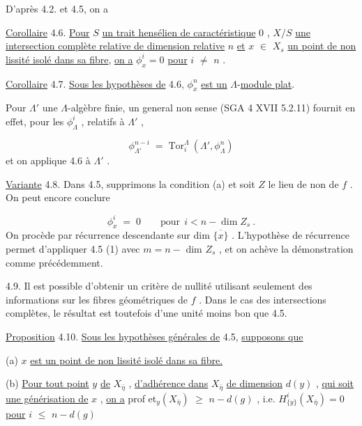 D'après 4.2. et 4.5, on a

\underline{Corollaire} 4.6.  \underline{Pour}  $S$  \underline{un trait hensélien de caractéristique} 0 ,  $X/S$  \underline{une intersection complète relative de dimension relative}  $n$  \underline{et}  $x$ $\in$ $X_s$  \underline{un point de non lissité isolé dans sa fibre}, \underline{on a}  $\phi^i_x = 0$  \underline{pour}  $i$ $\neq$ $n$ .

\underline{Corollaire} 4.7.  \underline{Sous les hypothèses de} 4.6,  $\phi^n_x$  \underline{est un}  $\Lambda$-\underline{module plat}.

Pour  $\Lambda'$  une $\Lambda$-algèbre finie, un general non sense (SGA 4 XVII 5.2.11) fournit en effet, pour les  $\phi^i_{\Lambda}$ , relatifs à  $\Lambda'$ ,



\begin{equation*}
\phi^{n-i}_{\Lambda'} \;=\; \mathrm{Tor}^{\Lambda}_{i}\ (\Lambda',\phi^n_{\Lambda})
\end{equation*}
et on applique 4.6 à  $\Lambda'$  .

\underline{Variante} 4.8.  Dans 4.5, supprimons la condition (a) et soit  $Z$  le lieu de non de  $f$ . On peut encore conclure

\begin{equation*}
\phi^i_x \;=\; 0 \qquad \text{pour}\ \ i < n - \dim Z_s\ .
\end{equation*}
On procède par récurrence descendante sur  dim $\overline{\{x\}}$ . L'hypothèse de récurrence permet d'appliquer 4.5 (1) avec  $m = n -$ dim $Z_s$ , et on achève la démonstration comme précédemment.

4.9.  Il est possible d'obtenir un critère de nullité utilisant seulement des informations sur les fibres géométriques de  $f$ . Dans le cas des intersections complètes, le résultat est toutefois d'une unité moins bon que 4.5.

\underline{Proposition} 4.10.  \underline{Sous les hypothèses générales de} 4.5, \underline{supposons que}

(a)  $x$  \underline{est un point de non lissité isolé dans sa fibre.}

(b) \underline{Pour tout point}  $y$  \underline{de}  $X_{\bar{\eta}}$  , \underline{d'adhérence dans}  $X_{\bar{\eta}}$  \underline{de dimension} $d(y)$ , \underline{qui soit une générisation de}  $x$ , \underline{on a}  prof et$_y(X_{\bar{\eta}})$ $\geqslant$ $n - d(g)$ ,  i.e. $H^i_{\{y\}}(X_{\bar{\eta}}) = 0$ \underline{pour}  $i$ $\leqslant$ $n - d(g)$


